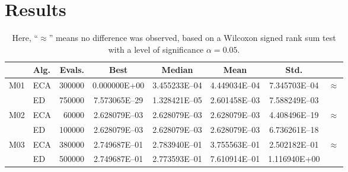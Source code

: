 \documentclass[12pt,letterpape]{article}
\begin{document}

\section{Results} %
\label{sec:results}

\begin{table}[!ht]
\centering
\begin{tabular}{clrccccc}
	\hline
	 & {\bf Alg.} & {\bf Evals}.  & {\bf Best} & {\bf Median} & {\bf Mean} & {\bf Std.} \\ \hline
	\multirow{2}{*}{M01}
	& ECA & 300000  & 0.000000E+00  & 3.455233E--04 & 4.449034E--04 & 7.345703E--04 &
	\multirow{2}{*}{$ \approx $}\\  
	& ED  & 750000  & 7.573065E--29 & 1.328421E--05 & 2.601458E--03 & 7.588249E--03 &  \\ \hline
	\multirow{2}{*}{M02}
	& ECA &  60000  & 2.628079E--03 & 2.628079E--03 & 2.628079E--03 & 4.408496E--19 & 
	\multirow{2}{*}{$ \approx $}\\ 
	& ED  & 100000  & 2.628079E--03 & 2.628079E--03 & 2.628079E--03 & 6.736261E--18 &  \\ \hline
	\multirow{2}{*}{M03}
	& ECA & 380000  & 2.749687E--01 & 2.783940E--01 & 3.755563E--01 & 2.502182E--01 & 
	\multirow{2}{*}{$ \approx $}\\ 
	& ED  & 500000  & 2.749687E--01 & 2.773593E--01 & 7.610914E--01 & 1.116940E+00  &  \\ \hline
\end{tabular}
\caption{Here, ``$\approx$'' means no difference was observed, based on a Wilcoxon signed rank sum test with a level of significance $\alpha = 0.05$.}
\end{table}

		
\end{document}
